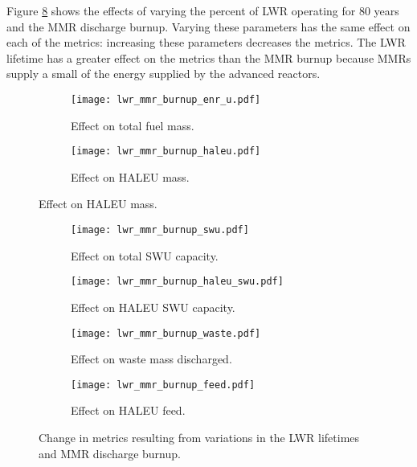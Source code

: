 Figure \ref{fig:lwr_mmr_burnup} shows the effects of varying the percent 
of \gls{LWR} operating for 80 years and the \gls{MMR} discharge burnup. 
Varying these parameters has the same effect on each of the metrics: 
increasing these parameters decreases the metrics. The \gls{LWR} lifetime 
has a greater effect on the metrics than the \gls{MMR} burnup because 
\glspl{MMR} supply a small of the energy supplied by the advanced reactors.

\begin{figure}
    \begin{subfigure}[t]{0.48\textwidth}
        \centering
        \texttt{[image: lwr\_mmr\_burnup\_enr\_u.pdf]}
        \caption{Effect on total fuel mass.}
        \label{fig:lwr_mmr_burnup__enr_u}
    \end{subfigure}
    \hfill
    \begin{subfigure}[t]{0.48\textwidth}
        \centering
        \texttt{[image: lwr\_mmr\_burnup\_haleu.pdf]}
        \caption{Effect on HALEU mass.}
        \label{fig:lwr_mmr_burnup_haleu}
    \end{subfigure}
\end{figure}
\begin{figure}
    \ContinuedFloat    
    \begin{subfigure}[t]{0.48\textwidth}
        \centering
        \texttt{[image: lwr\_mmr\_burnup\_swu.pdf]}
        \caption{Effect on total SWU capacity.}
        \label{fig:lwr_mmr_burnup_swu}
    \end{subfigure}
    \hfill
    \begin{subfigure}[t]{0.48\textwidth}
        \centering
        \texttt{[image: lwr\_mmr\_burnup\_haleu\_swu.pdf]}
        \caption{Effect on HALEU SWU capacity.}
        \label{fig:lwr_mmr_burnup_haleu_swu}
    \end{subfigure}
    
    \begin{subfigure}[t]{0.48\textwidth}
        \centering
        \texttt{[image: lwr\_mmr\_burnup\_waste.pdf]}
        \caption{Effect on waste mass discharged.}
        \label{fig:lwr_mmr_burnup_waste}
    \end{subfigure}
    \hfill
    \begin{subfigure}[t]{0.48\textwidth}
        \centering
        \texttt{[image: lwr\_mmr\_burnup\_feed.pdf]}
        \caption{Effect on HALEU feed.}
        \label{fig:lwr_mmr_burnup_feed}
    \end{subfigure}
    \caption{Change in metrics resulting from variations in the 
    LWR lifetimes and MMR discharge burnup.}
    \label{fig:lwr_mmr_burnup}
\end{figure}

